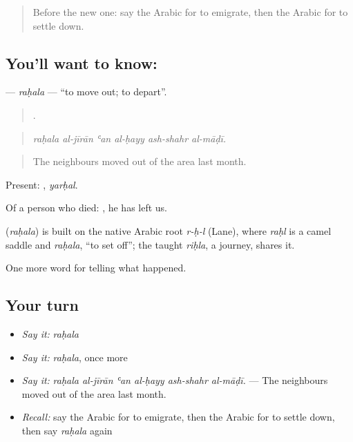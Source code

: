 \label{lesson:AR-C332-rahala}



\begin{quote}
Before the new one: say the Arabic for to emigrate, then the Arabic for to settle down.
\end{quote}

\subsection*{You'll want to know: }
\textbf{} — \emph{raḥala} — \textquotedblleft{}to move out; to depart\textquotedblright{}.

\begin{quote}
     .
\end{quote}

\begin{quote}
\emph{raḥala al-jīrān ʿan al-ḥayy ash-shahr al-māḍī.}
\end{quote}

\begin{quote}
The neighbours moved out of the area last month.
\end{quote}

Present: , \emph{yarḥal}.

Of a person who died:  , he has left us.

\begin{cousinweb}
\textbf{} (\emph{raḥala}) is built on the native Arabic root \emph{r-ḥ-l} (Lane), where \emph{raḥl} is a camel saddle and \emph{raḥala}, \textquotedblleft{}to set off\textquotedblright{}; the taught \emph{riḥla}, a journey, shares it.
\end{cousinweb}

\begin{grammarlens}[title={What you've built}]
One more word for telling what happened.
\end{grammarlens}

\subsection*{Your turn}
\begin{itemize}
\raggedright
  \item \emph{Say it:} \emph{raḥala}
  \item \emph{Say it:} \emph{raḥala}, once more
  \item \emph{Say it:} \emph{raḥala al-jīrān ʿan al-ḥayy ash-shahr al-māḍī.} — The neighbours moved out of the area last month.
  \item \emph{Recall:} say the Arabic for to emigrate, then the Arabic for to settle down, then say \emph{raḥala} again
\end{itemize}

